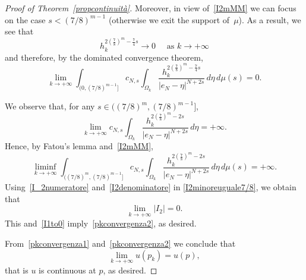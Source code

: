 \documentclass[10pt,a4paper]{amsart}
\begin{document}
\begin{proof}[Proof of Theorem~\ref{propcontinuità}]
Moreover, in view of~\eqref{I2mMM} we can focus on the case $s<(7/8)^{m-1}$
(otherwise we exit the support of~$\mu$).
As a result, we see that $$h_k^{2\left(\frac{7}{8}\right)^m-\frac{7}{4}s}\to 0
\quad{\mbox{ as $k\to +\infty$}}$$ and therefore, by the
dominated convergence theorem,
\begin{equation}\label{I_2numeratore}
\lim_{k\to+\infty}
\displaystyle\int_{(0,(7/8)^{m-1}]}c_{N,s}\int_{\Omega_k}\dfrac{h_k^{2\left(\frac{7}{8}\right)^m-\frac{7}{4}s}}{|e_N-\eta|^{N+2s}}\,d\eta\,d\mu(s)=0.
\end{equation}

We observe that, for any $s\in ((7/8)^{m},(7/8)^{m-1}]$, 
\[
\lim_{k\to +\infty} c_{N,s}\int_{\Omega_k}\dfrac{h_k^{2\left(\frac{7}{8}\right)^m-2s}}{|e_N-\eta|^{N+2s}}\,d\eta=+\infty.
\]
Hence, by Fatou's lemma and~\eqref{I2mMM},
\begin{equation}\label{I2denominatore}
\liminf_{k\to+\infty}
\int_{((7/8)^{m},(7/8)^{m-1}]}c_{N,s}\int_{\Omega_k}\dfrac{h_k^{2\left(\frac{7}{8}\right)^m-2s}}{|e_N-\eta|^{N+2s}}\,d\eta\,d\mu(s)=+\infty.
\end{equation}
Using~\eqref{I_2numeratore} and~\eqref{I2denominatore} in
\eqref{I2minoreuguale7/8}, we obtain that
\begin{equation}\label{LIMI2}
\lim_{k\to+\infty} |I_2|=0.
\end{equation}
This and~\eqref{I1to0} imply~\eqref{pkconvergenza2}, as desired.

{F}rom~\eqref{pkconvergenza1} and~\eqref{pkconvergenza2} we
conclude that
\[
\lim_{k\to+\infty}u(p_k)=u(p),
\]
that is $u$ is continuous at $p$, as desired.
\end{proof}
\end{document}
